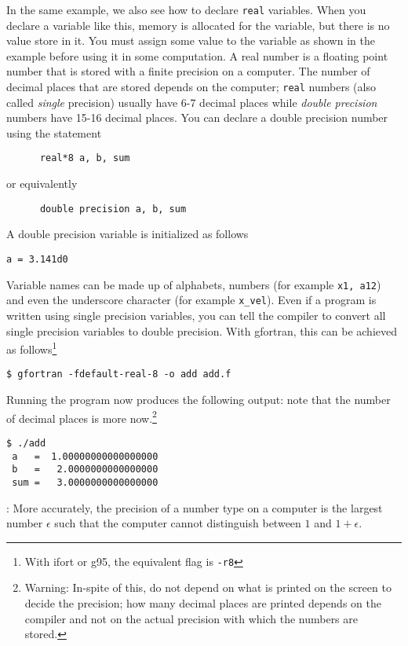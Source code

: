 \documentclass[11pt,oneside]{amsart}
\begin{document}
In the same example, we also see how to declare {\tt real} variables. When you declare a variable like this, memory is allocated for the variable, but there is no value store in it. You must assign some value to the variable as shown in the example before using it in some computation. A real number is a floating point number that is stored with a finite precision on a computer. The number of decimal places that are stored depends on the computer; {\tt real} numbers (also called {\em single} precision) usually have 6-7 decimal places while {\em double precision} numbers have 15-16 decimal places. You can declare a double precision number using the statement
\begin{verbatim}
      real*8 a, b, sum
\end{verbatim}
or equivalently
\begin{verbatim}
      double precision a, b, sum
\end{verbatim}
A double precision variable is initialized as follows
\begin{verbatim}
a = 3.141d0
\end{verbatim}
Variable names can be made up of alphabets, numbers (for example {\tt x1, a12}) and even the underscore character (for example {\tt x\_vel}).  Even if a program is written using single precision variables, you can tell the compiler to convert all single precision variables to double precision. With gfortran, this can be achieved as follows\footnote{With ifort or g95, the equivalent flag is {\tt -r8}}
\begin{verbatim}
$ gfortran -fdefault-real-8 -o add add.f
\end{verbatim}
Running the program now produces the following output: note that the number of decimal places is more now.\footnote{Warning: In-spite of this, do not depend on what is printed on the screen to decide the precision; how many decimal places are printed depends on the compiler and not on the actual precision with which the numbers are stored.}
\begin{verbatim}
$ ./add
 a   =  1.00000000000000000     
 b   =   2.0000000000000000     
 sum =   3.0000000000000000
 \end{verbatim}
 
 : More accurately, the precision of a number type on a computer is the largest number $\epsilon$ such that the computer cannot distinguish between $1$ and $1 + \epsilon$.
 
\end{document}
